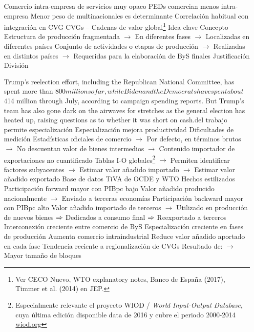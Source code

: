 \documentclass{nuevotema}
\begin{document}
\begin{esquemal}
				\4[iv] Comercio intra-empresa de servicios muy opaco
				\4[v] PEDs comercian menos intra-empresa
				\4[] Menor peso de multinacionales es determinante
				\4[vi] Correlación habitual con integración en CVG
		\2 CVGs -- Cadenas de valor global\footnote{Ver CECO Nuevo, WTO explanatory notes, Banco de España (2017), Timmer et al. (2014) en JEP.}
			\3 Idea clave
				\4 Concepto
				\4[] Estructura de producción fragmentada
				\4[] $\to$ En diferentes fases
				\4[] $\to$ Localizadas en diferentes países
				\4[] Conjunto de actividades o etapas de producción
				\4[] $\to$ Realizadas en distintos países
				\4[] $\to$ Requeridas para la elaboración de ByS finales
				\4 Justificación
				\4[] División

Trump’s reelection effort, including the Republican National Committee, has spent more than $800 million so far, while Biden and the Democrats have spent about $414 million through July, according to campaign spending reports. But Trump’s team has also gone dark on the airwaves for stretches as the general election has heated up, raising questions as to whether it was short on cash.del trabajo permite especialización
				\4[] Especialización mejora productividad
				\4 Dificultades de medición
				\4[] Estadísticas oficiales de comercio
				\4[] $\to$ Por defecto, en términos brutos
				\4[] $\to$ No descuentan valor de bienes intermedios
				\4[] $\to$ Contenido importador de exportaciones no cuantificado
				\4[] Tablas I-O globales\footnote{Especialmente relevante el proyecto WIOD / \textit{World Input-Output Database}, cuya última edición disponible data de 2016 y cubre el periodo 2000-2014 \url{wiod.org}}
				\4[] $\to$ Permiten identificar factores subyacentes
				\4[] $\to$ Estimar valor añadido importado
				\4[] $\to$ Estimar valor añadido exportado
				\4[] Base de datos TiVA de OCDE y WTO
			\3 Hechos estilizados
				\4[i] Participación forward mayor con PIBpc bajo
				\4[] Valor añadido producido nacionalmente
				\4[] $\to$ Enviado a terceras economías
				\4[ii]  Participación backward mayor con PIBpc alto
				\4[] Valor añadido importado de terceros
				\4[] $\to$ Utilizado en producción de nuevos bienes
				\4[] $\Rightarrow$ Dedicados a consumo final
				\4[] $\Rightarrow$ Reexportado a terceros
				\4[iii] Interconexión creciente entre comercio de ByS
				\4[iv] Especialización creciente en fases de producción
				\4[] Aumenta comercio intraindustrial
				\4[] Reduce valor añadido aportado en cada fase
				\4[v] Tendencia reciente a regionalización de CVGs
				\4[] Resultado de:
				\4[] $\to$ Mayor tamaño de bloques

\end{esquemal}
\end{document}
